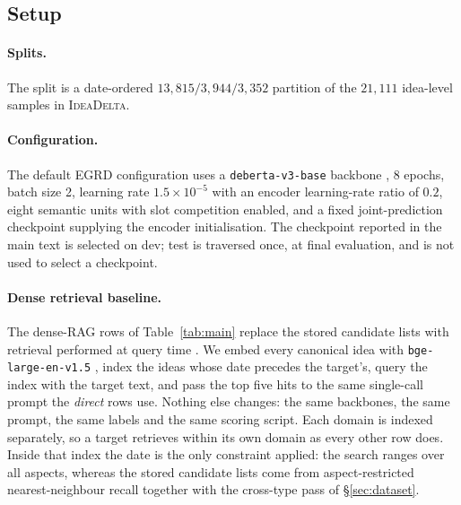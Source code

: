 
\subsection{Setup}
\label{app:setup}

\paragraph{Splits.}
The split is a date-ordered $13{,}815/3{,}944/3{,}352$ partition of the
$21{,}111$ idea-level samples in \textsc{IdeaDelta}.

\paragraph{Configuration.}
The default EGRD configuration uses a
\texttt{deberta-v3-base} backbone \citep{he2023deberta}, 8 epochs, batch size
2, learning rate
$1.5\times10^{-5}$ with an encoder learning-rate ratio of $0.2$, eight semantic
units with slot competition enabled, and a fixed joint-prediction checkpoint
supplying the encoder initialisation. The checkpoint reported in the main text
is selected on dev; test is traversed once, at final evaluation, and is not used
to select a checkpoint.

\paragraph{Dense retrieval baseline.}
The dense-RAG rows of Table~\ref{tab:main} replace the stored candidate
lists with retrieval performed at query time \citep{karpukhin2020dpr}. We
embed every canonical idea
with \texttt{bge-large-en-v1.5} \citep{xiao2024cpack}, index the ideas whose
date precedes the
target's, query the index with the target text, and pass the top five hits to
the same single-call prompt the \emph{direct} rows use. Nothing else changes:
the same backbones, the same prompt, the same labels and the same scoring
script.
Each domain is indexed separately, so a target retrieves within its own domain
as every other row does. Inside that index the date is the only constraint
applied: the search ranges over all aspects, whereas the stored candidate lists
come from aspect-restricted nearest-neighbour recall together with the
cross-type pass of \S\ref{sec:dataset}.

